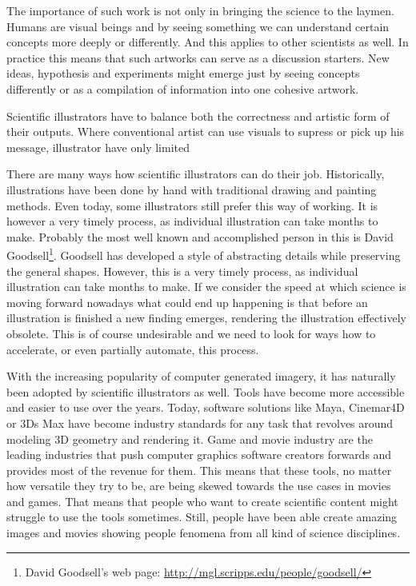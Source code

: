 \documentclass[
  digital, %
  table,   %
  nolof,     %
  nolot,     %
]{fithesis3}
\begin{document}
The importance of such work is not only in bringing the science to the laymen. Humans are visual beings and by seeing something we can understand certain concepts more deeply or differently. And this applies to other scientists as well. In practice this means that such artworks can serve as a discussion starters. New ideas, hypothesis and experiments might emerge just by seeing concepts differently or as a compilation of information into one cohesive artwork.

Scientific illustrators have to balance both the correctness and artistic form of their outputs. Where conventional artist can use visuals to supress or pick up his message, illustrator have only limited

There are many ways how scientific illustrators can do their job. Historically, illustrations have been done by hand with traditional drawing and painting methods. Even today, some illustrators still prefer this way of working. It is however a very timely process, as individual illustration can take months to make. Probably the most well known and accomplished person in this is David Goodsell\footnote{
  David Goodsell's web page: \url{http://mgl.scripps.edu/people/goodsell/}
}. Goodsell has developed a style of abstracting details while preserving the general shapes. However, this is a very timely process, as individual illustration can take months to make\cite{DavidGoodsellVideo}. If we consider the speed at which science is moving forward nowadays what could end up happening is that before an illustration is finished a new finding emerges, rendering the illustration effectively obsolete. This is of course undesirable and we need to look for ways how to accelerate, or even partially automate, this process.

With the increasing popularity of computer generated imagery, it has naturally been adopted by scientific illustrators as well. Tools have become more accessible and easier to use over the years. Today, software solutions like Maya, Cinemar4D or 3Ds Max have become industry standards for any task that revolves around modeling 3D geometry and rendering it. Game and movie industry are the leading industries that push computer graphics software creators forwards and provides most of the revenue for them. This means that these tools, no matter how versatile they try to be, are being skewed towards the use cases in movies and games. That means that people who want to create scientific content might struggle to use the tools sometimes. Still, people have been able create amazing images and movies showing people fenomena from all kind of science disciplines.
\end{document}
